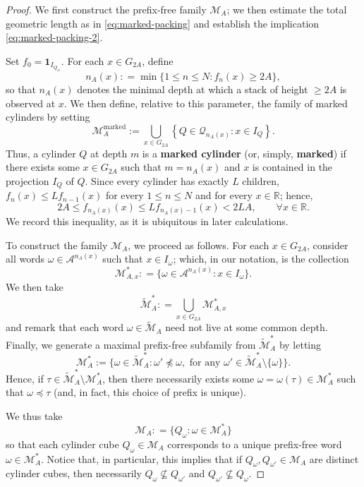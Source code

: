 \documentclass[10pt,a4paper]{amsart}
\begin{document}
\begin{proof}
We first construct the prefix-free family $\mathscr{M}_A$; we then estimate the total geometric length as in \eqref{eq:marked-packing} and establish the implication \eqref{eq:marked-packing-2}.

Set $f_0=\mathbf1_{I_{Q_\varnothing}}$.  For each $x\in G_{2A}$, define
$$
n_A (x) : = \min \big\{1 \leq n \leq N : f_{n} (x) \geq 2 A \big\},
$$
so that $n_A (x)$ denotes the minimal depth at which a stack of height $\geq 2 A$ is observed at $x$. We then define, relative to this parameter, the family of marked cylinders by setting
$$
 \mathscr{M}^{\text{marked}}_A
 :=
 \bigcup_{x\in G_{2A}}
 \left\{
 Q\in\mathscr Q_{n_A(x)}:x\in I_Q
 \right\}.
$$
Thus, a cylinder $Q$ at depth $m$ is a \textbf{marked cylinder} (or, simply, \textbf{marked}) if there exists some $x \in G_{2A}$ such that $m = n_A (x)$ and $x$ is contained in the projection $I_Q$ of $Q$. Since every cylinder has exactly $L$ children, $f_n(x)\leq Lf_{n-1}(x)$ for every $1 \leq n \leq N$ and for every $x \in \mathbb{R}$; hence,
\begin{equation}\label{eq:first-crossing}
 2A\leq f_{n_A(x)}(x)
 \leq Lf_{n_A(x)-1}(x)<2LA, \qquad \forall x \in \mathbb{R}.
\end{equation}
We record this inequality, as it is ubiquitous in later calculations.
 
To construct the family $\mathscr{M}_A$, we proceed as follows. For each $x \in G_{2A}$, consider all words $\omega \in \mathcal{A}^{n_A(x)}$ such that $x \in I_{\omega}$; which, in our notation, is the collection
$$
\mathscr{M}_{A,x}^* : = \big\{\omega \in \mathcal{A}^{n_A(x)} : x \in I_{\omega} \big\}.
$$
We then take 
$$
\widetilde{\mathscr{M}}^*_{A} : = \bigcup_{x \in G_{2A}} \mathscr{M}_{A,x}^*
$$
and remark that each word $\omega \in \widetilde{\mathscr{M}}_{A}$ need not live at some common depth. Finally, we generate a maximal prefix-free subfamily from $\widetilde{\mathscr{M}}_{A}^*$ by letting
$$
\mathscr{M}_{A}^* := \big\{\omega \in \widetilde{\mathscr{M}}_{A}^* : \omega' \not\preceq \omega, \textrm{ for any } \omega' \in \widetilde{\mathscr{M}}^*_{A} \setminus \{\omega \}\big\}.
$$
Hence, if $\tau \in \widetilde{\mathscr{M}}_{A}^* \setminus  \mathscr{M}_{A}^*$, then there necessarily exists some $\omega = \omega(\tau) \in \mathscr{M}_{A}^*$ such that $\omega \preceq \tau$ (and, in fact, this choice of prefix is unique).

We thus take
$$
\mathscr{M}_A : = \big\{Q_{\omega} : \omega \in \mathscr{M}_A^* \big\}
$$
so that each cylinder cube $Q_{\omega} \in \mathscr{M}_A$ corresponds to a unique prefix-free word $\omega \in \mathscr{M}_A^*$. Notice that, in particular, this implies that if $Q_{\omega}, Q_{\omega'} \in \mathscr{M}_A$ are distinct cylinder cubes, then necessarily $Q_{\omega} \not\subseteq Q_{\omega'}$ and $Q_{\omega'} \not\subseteq Q_{\omega}$.


\end{proof}
\end{document}
